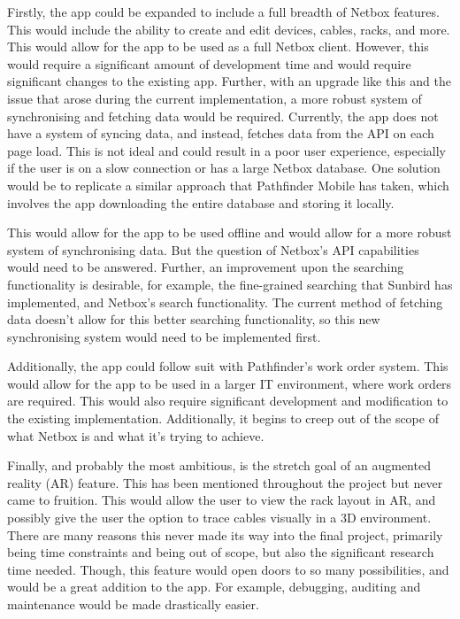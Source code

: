 \documentclass [11pt,a4paper]{article}
\begin{document}
Firstly, the app could be expanded to include a full breadth of Netbox features. This would include the ability to create and edit devices, cables, racks, and more. This would allow for the app to be used as a full Netbox client. However, this would require a significant amount of development time and would require significant changes to the existing app. Further, with an upgrade like this and the issue that arose during the current implementation, a more robust system of synchronising and fetching data would be required. Currently, the app does not have a system of syncing data, and instead, fetches data from the API on each page load. This is not ideal and could result in a poor user experience, especially if the user is on a slow connection or has a large Netbox database. One solution would be to replicate a similar approach that Pathfinder Mobile has taken, which involves the app downloading the entire database and storing it locally.

This would allow for the app to be used offline and would allow for a more robust system of synchronising data. But the question of Netbox's API capabilities would need to be answered. Further, an improvement upon the searching functionality is desirable, for example, the fine-grained searching that Sunbird has implemented, and Netbox's search functionality. The current method of fetching data doesn't allow for this better searching functionality, so this new synchronising system would need to be implemented first.

Additionally, the app could follow suit with Pathfinder's work order system. This would allow for the app to be used in a larger IT environment, where work orders are required. This would also require significant development and modification to the existing implementation. Additionally, it begins to creep out of the scope of what Netbox is and what it's trying to achieve.

Finally, and probably the most ambitious, is the stretch goal of an augmented reality (AR) feature. This has been mentioned throughout the project but never came to fruition. This would allow the user to view the rack layout in AR, and possibly give the user the option to trace cables visually in a 3D environment. There are many reasons this never made its way into the final project, primarily being time constraints and being out of scope, but also the significant research time needed. Though, this feature would open doors to so many possibilities, and would be a great addition to the app. For example, debugging, auditing and maintenance would be made drastically easier. 
\end{document}
